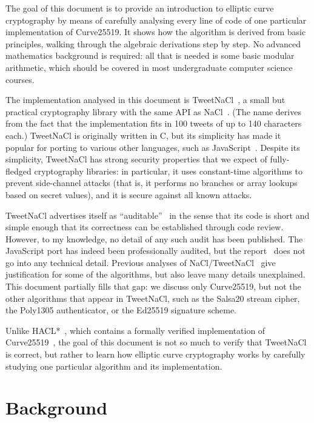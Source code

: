 \documentclass{article}
\begin{document}
The goal of this document is to provide an introduction to elliptic curve cryptography by means of carefully analysing every line of code of one particular implementation of Curve25519.
It shows how the algorithm is derived from basic principles, walking through the algebraic derivations step by step.
No advanced mathematics background is required: all that is needed is some basic modular arithmetic, which should be covered in most undergraduate computer science courses.

The implementation analysed in this document is TweetNaCl~\cite{Bernstein:2014ca,TweetNaCl}, a small but practical cryptography library with the same API as NaCl~\cite{NaCl,Bernstein:2012}.
(The name derives from the fact that the implementation fits in 100 tweets of up to 140 characters each.)
TweetNaCl is originally written in C, but its simplicity has made it popular for porting to various other languages, such as JavaScript~\cite{TweetNaCljs}.
Despite its simplicity, TweetNaCl has strong security properties that we expect of fully-fledged cryptography libraries: in particular, it uses constant-time algorithms to prevent side-channel attacks (that is, it performs no branches or array lookups based on secret values), and it is secure against all known attacks.

TweetNaCl advertises itself as ``auditable''~\cite{Bernstein:2014ca} in the sense that its code is short and simple enough that its correctness can be established through code review.
However, to my knowledge, no detail of any such audit has been published.
The JavaScript port has indeed been professionally audited, but the report~\cite{TweetNaClAudit} does not go into any technical detail.
Previous analyses of NaCl/TweetNaCl~\cite{Bernstein:2009,Janssen:2014} give justification for some of the algorithms, but also leave many details unexplained.
This document partially fills that gap: we discuss only Curve25519, but not the other algorithms that appear in TweetNaCl, such as the Salsa20 stream cipher, the Poly1305 authenticator, or the Ed25519 signature scheme.

Unlike HACL*~\cite{HACLStar}, which contains a formally verified implementation of Curve25519~\cite{Zinzindohoue:2017fc}, the goal of this document is not so much to verify that TweetNaCl is correct, but rather to learn how elliptic curve cryptography works by carefully studying one particular algorithm and its implementation.

\section{Background}\label{sec:background}
\end{document}
